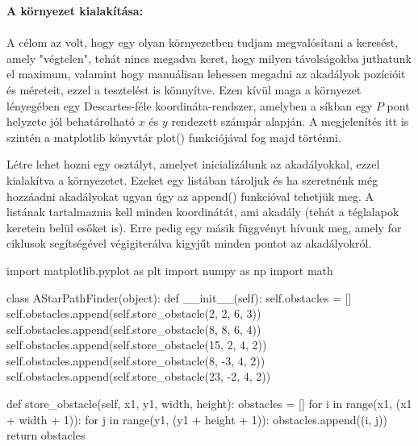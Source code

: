 \textbf{A környezet kialakítása:}
\\\\
A célom az volt, hogy egy olyan környezetben tudjam megvalósítani a keresést, amely "végtelen", tehát nincs megadva keret, hogy milyen távolságokba juthatunk el maximum, valamint hogy manuálisan lehessen megadni az akadályok pozícióit és méreteit, ezzel a tesztelést is könnyítve. Ezen kívül maga a környezet lényegében egy Descartes-féle koordináta-rendszer, amelyben a síkban egy $ P $ pont helyzete jól behatárolható $ x $ és $ y $ rendezett számpár alapján. A megjelenítés itt is szintén a matplotlib könyvtár plot() funkciójával fog majd történni.

Létre lehet hozni egy osztályt, amelyet inicializálunk az akadályokkal, ezzel kialakítva a környezetet. Ezeket egy listában tároljuk és ha szeretnénk még hozzáadni akadályokat ugyan úgy az append() funkcióval tehetjük meg. A listának tartalmaznia kell minden koordinátát, ami akadály (tehát a téglalapok keretein belül esőket is). Erre pedig egy másik függvényt hívunk meg, amely for ciklusok segítségével végigiterálva kigyjűt minden pontot az akadályokról. 
\begin{python}
import matplotlib.pyplot as plt
import numpy as np
import math


class AStarPathFinder(object):
    def __init__(self):
        self.obstacles = []
        self.obstacles.append(self.store_obstacle(2, 2, 6, 3))
        self.obstacles.append(self.store_obstacle(8, 8, 6, 4))
        self.obstacles.append(self.store_obstacle(15, 2, 4, 2))
        self.obstacles.append(self.store_obstacle(8, -3, 4, 2))
        self.obstacles.append(self.store_obstacle(23, -2, 4, 2))
        
 	def store_obstacle(self, x1, y1, width, height):
        obstacles = []
        for i in range(x1, (x1 + width + 1)):
            for j in range(y1, (y1 + height + 1)):
                obstacles.append((i, j))
        return obstacles
\end{python}

\bigskip

